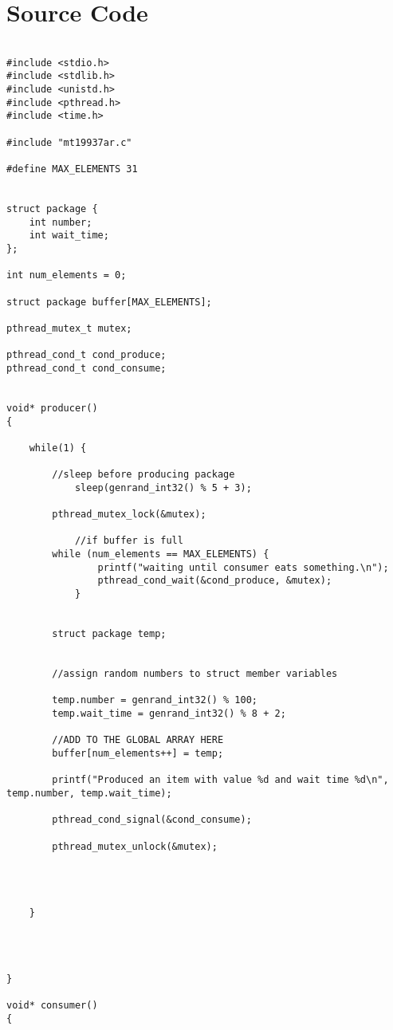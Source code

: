 \documentclass[letterpaper,
10pt, titlepage, draftclsnofoot, onecolumn]{IEEEtran}
\begin{document}
\section*{Source Code}
\begin{lstlisting}

#include <stdio.h>
#include <stdlib.h>
#include <unistd.h>
#include <pthread.h>
#include <time.h>

#include "mt19937ar.c"

#define MAX_ELEMENTS 31


struct package {
	int number;
	int wait_time;
};

int num_elements = 0;

struct package buffer[MAX_ELEMENTS];

pthread_mutex_t mutex;

pthread_cond_t cond_produce;
pthread_cond_t cond_consume;


void* producer()
{

	while(1) {

		//sleep before producing package
	    	sleep(genrand_int32() % 5 + 3);

		pthread_mutex_lock(&mutex);

	        //if buffer is full
		while (num_elements == MAX_ELEMENTS) {
	       		printf("waiting until consumer eats something.\n");
	        	pthread_cond_wait(&cond_produce, &mutex);
	        }


		struct package temp;


		//assign random numbers to struct member variables

		temp.number = genrand_int32() % 100;
		temp.wait_time = genrand_int32() % 8 + 2;

		//ADD TO THE GLOBAL ARRAY HERE
		buffer[num_elements++] = temp;

		printf("Produced an item with value %d and wait time %d\n", temp.number, temp.wait_time);

		pthread_cond_signal(&cond_consume);

		pthread_mutex_unlock(&mutex);




    }




}

void* consumer()
{



\end{lstlisting}
\end{document}
